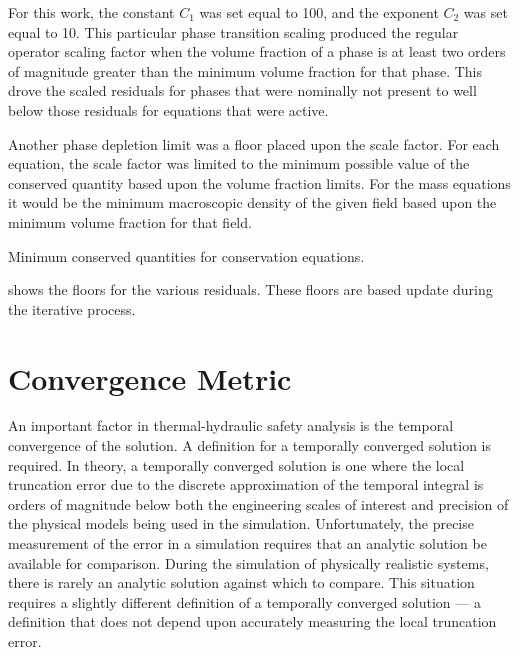 For this work, the constant $C_1$ was set equal to 100, and the exponent $C_2$ was set equal to 10.
This particular phase transition scaling produced the regular operator scaling factor when the volume fraction of a phase is at least two orders of magnitude greater than the minimum volume fraction for that phase.
This drove the scaled residuals for phases that were nominally not present to well below those residuals for equations that were active.

Another phase depletion limit was a floor placed upon the scale factor.
For each equation, the scale factor was limited to the minimum possible value of the conserved quantity based upon the volume fraction limits.
For the mass equations it would be the minimum macroscopic density of the given field based upon the minimum volume fraction for that field.

\begin{table}[ht]
\centering

\caption{Minimum conserved quantities for conservation equations.}
\label{tab:minimumConservedValues}
\end{table}

 shows the floors for the various residuals.
These floors are based update during the iterative process.

\section{Convergence Metric}
\label{sect:temporal_convergence}

An important factor in thermal-hydraulic safety analysis is the temporal convergence of the solution.
A definition for a temporally converged solution is required.
In theory, a temporally converged solution is one where the local truncation error due to the discrete approximation of the temporal integral is orders of magnitude below both the engineering scales of interest and precision of the physical models being used in the simulation.
Unfortunately, the precise measurement of the error in a simulation requires that an analytic solution be available for comparison.
During the simulation of physically realistic systems, there is rarely an analytic solution against which to compare.
This situation requires a slightly different definition of a temporally converged solution --- a definition that does not depend upon accurately measuring the local truncation error.


